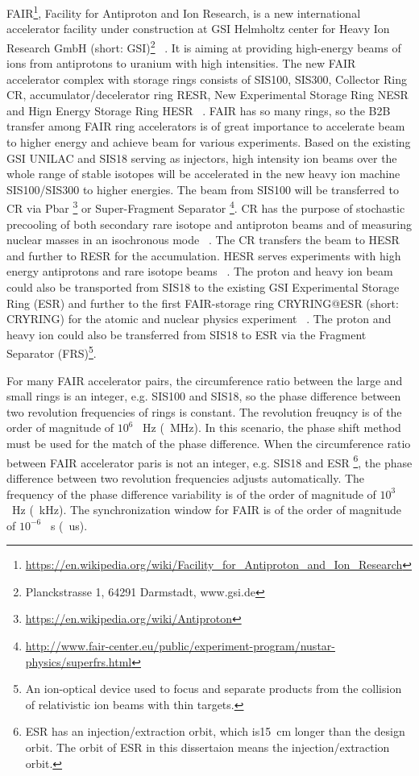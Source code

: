 FAIR\footnote{\url{https://en.wikipedia.org/wiki/Facility_for_Antiproton_and_Ion_Research}}, Facility for Antiproton and Ion Research, is a new international accelerator facility under construction at GSI Helmholtz center for Heavy Ion Research GmbH (short: GSI)\footnote{Planckstrasse 1, 64291 Darmstadt, www.gsi.de} ~\cite{eschke_international_2005, _fair_2011}. It is aiming at providing high-energy beams of ions from antiprotons to uranium with high intensities. The new FAIR accelerator complex with storage rings consists of SIS100, SIS300, Collector Ring CR, accumulator/decelerator ring RESR, New Experimental Storage Ring NESR and Hign Energy Storage Ring HESR ~\cite{spiller_fair_2006, steck_advanced_2008}. FAIR has so many rings, so the B2B transfer among FAIR ring accelerators is of great importance to accelerate beam to higher energy and achieve beam for various experiments. Based on the existing GSI \gls{UNILAC} and SIS18 serving as injectors, high intensity ion beams over the whole range of stable isotopes will be accelerated in the new heavy ion machine SIS100/SIS300 to higher energies. The beam from SIS100 will be transferred to CR via Pbar \footnote{\url{https://en.wikipedia.org/wiki/Antiproton}} or Super-Fragment Separator \footnote{\url{http://www.fair-center.eu/public/experiment-program/nustar-physics/superfrs.html}}. CR has the purpose of stochastic precooling of both secondary rare isotope and antiproton beams and of measuring nuclear masses in an isochronous mode ~\cite{nolden_collector_2006, abe_technical_2010}. The CR transfers the beam to HESR and further to RESR for the accumulation. HESR serves experiments with high energy antiprotons and rare isotope beams ~\cite{toelle_hesr_2007}. The proton and heavy ion beam could also be transported from SIS18 to the existing GSI Experimental Storage Ring (ESR) and further to the first FAIR-storage ring CRYRING@ESR (short: CRYRING) for the atomic and nuclear physics experiment ~\cite{lestinsky_cryring_2015, lestinsky_cryring_2012}. The proton and heavy ion could also be transferred from SIS18 to ESR via the Fragment Separator (\gls{FRS})\footnote{An ion-optical device used to focus and separate products from the collision of relativistic ion beams with thin targets.}.

For many FAIR accelerator pairs, the circumference ratio between the large and small rings is an integer, e.g. SIS100 and SIS18, so the phase difference between two revolution frequencies of rings is constant. The revolution freuqncy is of the order of magnitude of $10^6$ \SI{}{Hz} (\SI{}{MHz}). In this scenario, the phase shift method must be used for the match of the phase difference. When the circumference ratio between FAIR accelerator paris is not an integer, e.g. SIS18 and ESR \footnote{ESR has an injection/extraction orbit, which is\SI{15}{cm} longer than the design orbit. The orbit of ESR in this dissertaion means the injection/extraction orbit.}, the phase difference between two revolution frequencies adjusts automatically. The frequency of the phase difference variability is of the order of magnitude of $10^3$  \SI{}{Hz} (\SI{}{kHz}). The synchronization window for FAIR is of the order of magnitude of $10^{-6}$ \SI{}{s} (\SI{}{us}).


